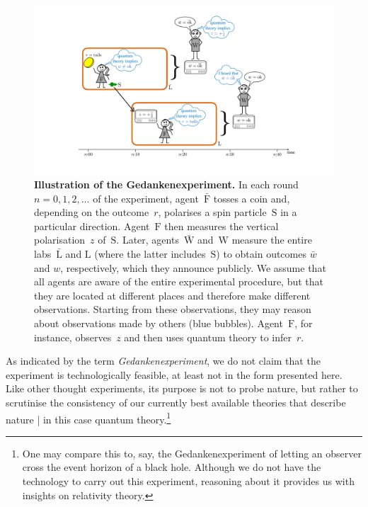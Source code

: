 \documentclass[12pt]{article}
\theoremstyle{mystyle}
\theoremstyle{definition}
\newcommand*{\Friendone}{\mathrm{\bar{F}}}
\newcommand*{\Friendtwo}{\mathrm{F}}
\newcommand*{\Labone}{\mathrm{\bar{L}}}
\newcommand*{\Labtwo}{\mathrm{L}}
\newcommand*{\Assistant}{\mathrm{\bar{W}}}
\newcommand*{\Wigner}{\mathrm{W}}
\newcommand*{\Spin}{\mathrm{S}}
\newcommand*{\wb}{\bar{w}}
\begin{document}
 
\begin{figure}[t]
\centering
\includegraphics[trim= 0cm  4.2cm 0cm 2.3cm, clip=true, scale=0.2]{WFDiagramRW.pdf}
\caption{{\bf Illustration of the Gedankenexperiment.} In each round~$n = 0, 1, 2, \ldots$ of the experiment, agent~$\Friendone$ tosses a coin and, depending on the outcome~$r$, polarises a spin particle~$\Spin$ in a particular direction.  Agent~$\Friendtwo$ then measures the vertical polarisation~$z$ of~$\Spin$. Later, agents~$\Assistant$ and~$\Wigner$ measure the entire labs~$\Labone$ and $\Labtwo$ (where the latter includes~$\Spin$) to obtain outcomes $\wb$ and $w$, respectively, which they announce publicly. We assume that all agents are aware of the entire experimental procedure, but that they are located at different places and therefore make different observations.  Starting from these observations, they may reason about observations made by others (blue bubbles).  Agent~$\Friendtwo$, for instance, observes~$z$ and then uses quantum theory to infer~$r$. \vspace{-1.4ex}
\label{fig_EWF}
}
\end{figure}

As indicated by the term \emph{Gedankenexperiment}, we do not claim that the experiment is technologically feasible, at least not in the form presented here. Like other thought experiments, its purpose is not to probe nature, but rather to scrutinise the consistency of our currently best available theories that describe nature | in this case quantum theory.\footnote{One may compare this to, say, the Gedankenexperiment of letting an observer cross the event horizon of a black hole. Although we do not have the technology to carry out this experiment, reasoning about it provides us with insights on relativity theory.}
\end{document}
